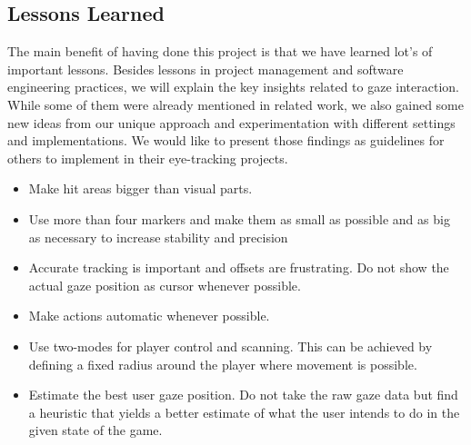 \documentclass{sigchi}
\begin{document}
\subsection{Lessons Learned}
The main benefit of having done this project is that we have learned lot's of important lessons. Besides lessons in project management and software engineering practices, we will explain the key insights related to gaze interaction. While some of them were already mentioned in related work, we also gained some new ideas from our unique approach and experimentation with different settings and implementations. We would like to present those findings as guidelines for others to implement in their eye-tracking projects.
 \begin{itemize}
\item Make hit areas bigger than visual parts.
\item Use more than four markers and make them as small as possible and as big as necessary to increase stability and precision
\item Accurate tracking is important and offsets are frustrating. Do not show the actual gaze position as cursor whenever possible.
\item Make actions automatic whenever possible.
\item Use two-modes for player control and scanning. This can be achieved by defining a fixed radius around the player where movement is possible.
\item Estimate the best user gaze position. Do not take the raw gaze data but find a heuristic that yields a better estimate of what the user intends to do in the given state of the game.
\end{itemize}
\end{document}
